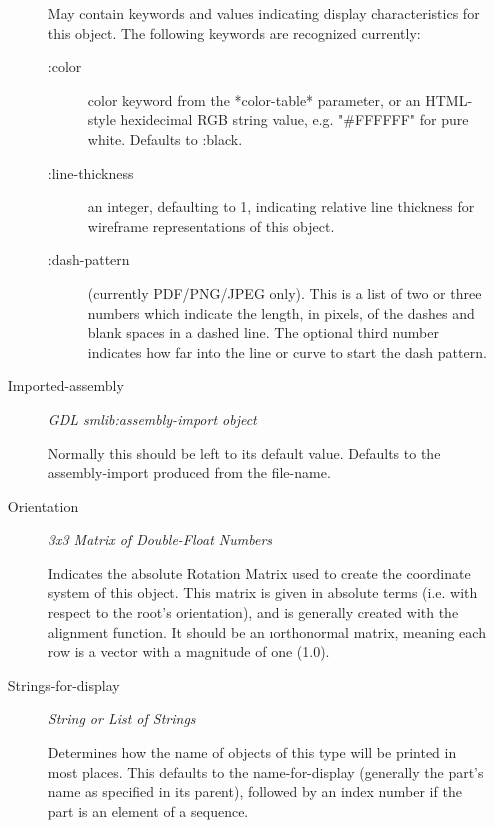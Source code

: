 \documentclass [11pt]{book}
\begin{document}
\begin{itemize}
\begin{description}
 May contain keywords and values indicating display characteristics for
this object. The following keywords are recognized currently:



\begin{description}


\item[:color]
 color keyword from the *color-table* parameter, or an HTML-style hexidecimal
RGB string value, e.g. "\#FFFFFF" for pure white. Defaults to :black.


\item[:line-thickness]
 an integer, defaulting to 1, indicating relative line thickness for wireframe
representations of this object.


\item[:dash-pattern]
(currently PDF/PNG/JPEG only). This is a list of two or three numbers which indicate the length,
in pixels, of the dashes and blank spaces in a dashed line. The optional third number
indicates how far into the line or curve to start the dash pattern.

\end{description}





\item [Imported-assembly]
\emph{GDL smlib:assembly-import object}

 Normally this should be left to its default value.
Defaults to the assembly-import produced from the file-name.




\item [Orientation]
\emph{3x3 Matrix of Double-Float Numbers}

 Indicates the absolute Rotation Matrix used to create
the coordinate system of this object. This matrix is given in absolute terms (i.e. with
respect to the root's orientation), and is generally created with the alignment function.
It should be an 
\i{orthonormal} matrix, meaning each row is a vector with a magnitude
of one (1.0).




\item [Strings-for-display]
\emph{String or List of Strings}

 Determines how the name of objects of
this type will be printed in most places.  This defaults to the
name-for-display (generally the part's name as specified in its
parent), followed by an index number if the part is an element of a
sequence.





\end{description}
\end{itemize}
\end{document}
